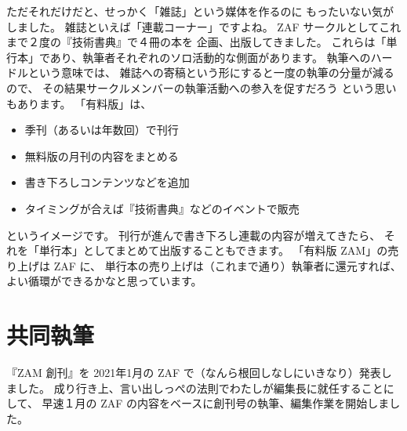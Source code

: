 \documentclass[dvipdfmx,autodetect-engine,10pt,b5paper,papersize,openany,dvipsnames]{jsbook}
\begin{document}
\begin{multicols}{2}
ただそれだけだと、せっかく「雑誌」という媒体を作るのに
もったいない気がしました。
雑誌といえば「連載コーナー」ですよね。
ZAF サークルとしてこれまで２度の『技術書典』で４冊の本を
企画、出版してきました。
これらは「単行本」であり、執筆者それぞれのソロ活動的な側面があります。
執筆へのハードルという意味では、
雑誌への寄稿という形にすると一度の執筆の分量が減るので、
その結果サークルメンバーの執筆活動への参入を促すだろう
という思いもあります。
「有料版」は、
\begin{itemize}
  \item 季刊（あるいは年数回）で刊行
  \item 無料版の月刊の内容をまとめる
  \item 書き下ろしコンテンツなどを追加
  \item タイミングが合えば『技術書典』などのイベントで販売
\end{itemize}
というイメージです。
刊行が進んで書き下ろし連載の内容が増えてきたら、
それを「単行本」としてまとめて出版することもできます。
「有料版 ZAM」の売り上げは ZAF に、
単行本の売り上げは（これまで通り）執筆者に還元すれば、
よい循環ができるかなと思っています。


\section{共同執筆}
『ZAM 創刊』を 2021年1月の ZAF で（なんら根回しなしにいきなり）発表しました。
成り行き上、言い出しっぺの法則でわたしが編集長に就任することにして、
早速１月の ZAF の内容をベースに創刊号の執筆、編集作業を開始しました。



\end{multicols}
\end{document}
